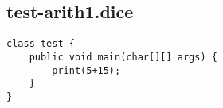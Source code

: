 \subsection{test-arith1.dice}
\begin{verbatim}
class test {
	public void main(char[][] args) {
		print(5+15);
	}
}
\end{verbatim}